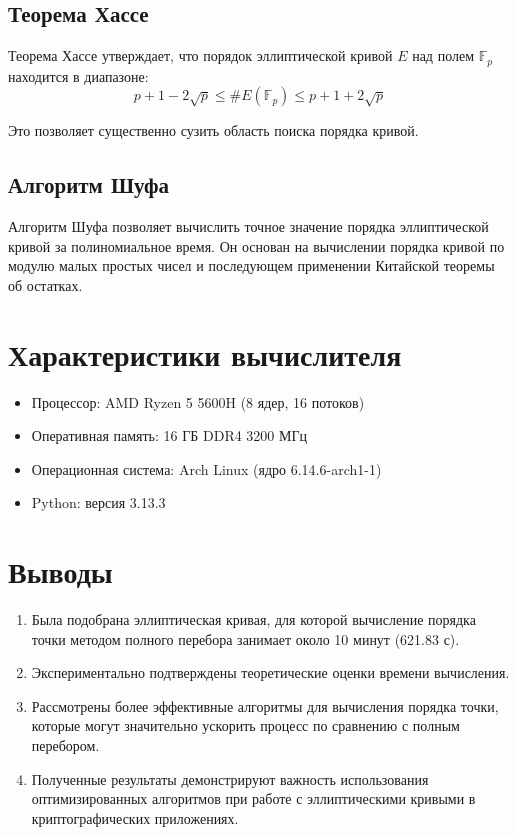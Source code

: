 \documentclass[a4paper,12pt]{article}
\begin{document}
\subsection{Теорема Хассе}
Теорема Хассе утверждает, что порядок эллиптической кривой $E$ над полем $\mathbb{F}_p$ находится в диапазоне:
\begin{equation}
p + 1 - 2\sqrt{p} \leq \#E(\mathbb{F}_p) \leq p + 1 + 2\sqrt{p}
\end{equation}

Это позволяет существенно сузить область поиска порядка кривой.

\subsection{Алгоритм Шуфа}
Алгоритм Шуфа позволяет вычислить точное значение порядка эллиптической кривой за полиномиальное время. Он основан на вычислении порядка кривой по модулю малых простых чисел и последующем применении Китайской теоремы об остатках.

\section{Характеристики вычислителя}
\begin{itemize}
    \item Процессор:  AMD Ryzen 5 5600H (8 ядер, 16 потоков)
    \item Оперативная память: 16 ГБ DDR4 3200 МГц
    \item Операционная система: Arch Linux (ядро 6.14.6-arch1-1)
    \item Python: версия 3.13.3
\end{itemize}

\section{Выводы}
\begin{enumerate}
    \item Была подобрана эллиптическая кривая, для которой вычисление порядка точки методом полного перебора занимает около 10 минут (621.83 с).
    \item Экспериментально подтверждены теоретические оценки времени вычисления.
    \item Рассмотрены более эффективные алгоритмы для вычисления порядка точки, которые могут значительно ускорить процесс по сравнению с полным перебором.
    \item Полученные результаты демонстрируют важность использования оптимизированных алгоритмов при работе с эллиптическими кривыми в криптографических приложениях.
\end{enumerate}
\end{document}

